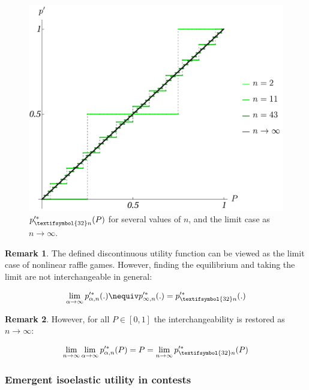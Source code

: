 \documentclass{article}
\theoremstyle{definition}
\newtheorem*{remark}{Remark}
\begin{document}
\begin{figure}[H]
    \centering
    \includegraphics[width=12 cm]{img/pp_n_P.pdf}
    \caption{$p'^*_{\text{\textifsymbol{32}} n}(P)$ for several values of $n$, and the limit case as $n \to \infty$.}
    \label{fig:pp_n_P}
\end{figure}

\begin{remark}
    The defined discontinuous utility function can be viewed as the limit case of nonlinear raffle games. However, finding the equilibrium and taking the limit are not interchangeable in general:

    \begin{equation}
    \lim_{\alpha \to \infty} p'^*_{\alpha,n}(.) \nequiv p'^*_{\infty,n}(.) = p'^*_{\text{\textifsymbol{32}} n}(.)
    \end{equation}
    
\end{remark}

\begin{remark}
    However, for all $P \in [0,1]$ the interchangeability is restored as $n \to \infty$:

    \begin{equation}
    \lim_{n \to \infty } \lim_{\alpha \to \infty} p'^*_{\alpha,n}(P) = P =  \lim_{n \to \infty }p'^*_{\text{\textifsymbol{32}} n}(P) 
    \end{equation}
    
\end{remark}

\subsubsection{Emergent isoelastic utility in contests}
\end{document}
